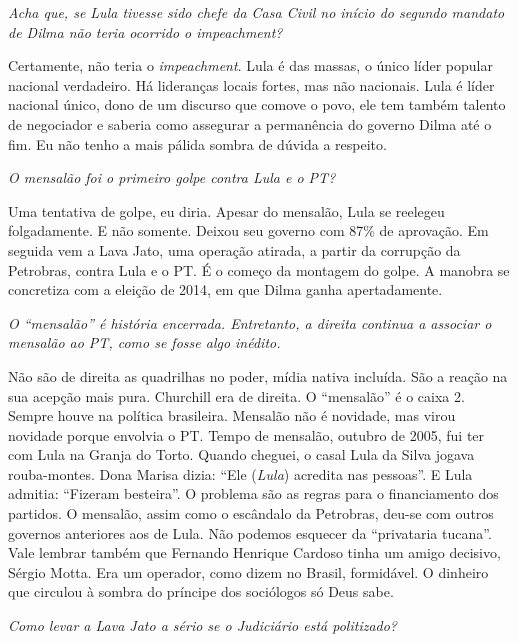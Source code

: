 \itshape
Acha que, se Lula tivesse sido chefe da Casa Civil no
início do segundo mandato de Dilma não teria ocorrido o
\emph{impeachment}?

\normalfont 
Certamente, não teria o \emph{impeachment}. Lula é das
massas, o único líder popular nacional verdadeiro. Há lideranças locais
fortes, mas não nacionais. Lula é líder nacional único, dono de um
discurso que comove o povo, ele tem também talento de negociador e
saberia como assegurar a permanência do governo Dilma até o fim. Eu não
tenho a mais pálida sombra de dúvida a respeito.

\itshape
O mensalão foi o primeiro golpe contra Lula e o PT?

\normalfont 
Uma tentativa de golpe, eu diria. Apesar do mensalão,
Lula se reelegeu folgadamente. E não somente. Deixou seu governo com
87\% de aprovação. Em seguida vem a Lava Jato, uma operação atirada, a
partir da corrupção da Petrobras, contra Lula e o PT. É o começo da
montagem do golpe. A manobra se concretiza com a eleição de 2014, em que
Dilma ganha apertadamente.

\itshape
O ``mensalão'' é história encerrada. Entretanto, a
direita continua a associar o mensalão ao PT, como se fosse algo
inédito.

\normalfont 
Não são de direita as quadrilhas no poder, mídia nativa
incluída. São a reação na sua acepção mais pura. Churchill era de
direita. O ``mensalão'' é o caixa 2. Sempre houve na política
brasileira. Mensalão não é novidade, mas virou novidade porque envolvia
o PT. Tempo de mensalão, outubro de 2005, fui ter com Lula na Granja do
Torto. Quando cheguei, o casal Lula da Silva jogava rouba-montes. Dona
Marisa dizia: ``Ele (\emph{Lula}) acredita nas pessoas''. E Lula
admitia: ``Fizeram besteira''. O problema são as regras para o
financiamento dos partidos. O mensalão, assim como o escândalo da
Petrobras, deu-se com outros governos anteriores aos de Lula. Não
podemos esquecer da ``privataria tucana''. Vale lembrar também que
Fernando Henrique Cardoso tinha um amigo decisivo, Sérgio Motta. Era um
operador, como dizem no Brasil, formidável. O dinheiro que circulou à
sombra do príncipe dos sociólogos só Deus sabe.

\itshape
Como levar a Lava Jato a sério se o Judiciário está
politizado?

